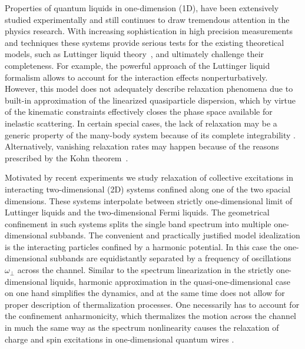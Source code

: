 
\label{chap3}
Properties of quantum liquids in one-dimension (1D), have been extensively studied experimentally and still continues to draw tremendous attention in the physics research.\cite{Review-1,Review-2,Review-3}  With increasing sophistication in high precision measurements and techniques these systems provide serious tests for the existing theoretical models, such as Luttinger liquid theory~\cite{Haldane,Stone,Gogolin,Giamarchi}, and ultimately challenge their completeness.  For example, the powerful approach of the Luttinger liquid formalism allows to account for the interaction effects nonperturbatively. However, this model does not adequately describe relaxation phenomena due to built-in approximation of the linearized quasiparticle dispersion, which by virtue of the kinematic constraints effectively closes the phase space available for inelastic scattering. In certain special cases, the lack of relaxation may be a generic property of the many-body system because of its complete integrability \cite{Mattis,Sutherland}. Alternatively, vanishing relaxation rates may happen because of the reasons prescribed by the Kohn theorem~\cite{Kohn1961,Dobson1994}.     

Motivated by recent experiments \cite{Kinast,Bartenstein,Altmeyer,Wright} we study relaxation of collective excitations in interacting two-dimensional (2D) systems confined along one of the two spacial dimensions. These systems interpolate between strictly one-dimensional limit of Luttinger liquids and the two-dimensional Fermi liquids. The geometrical confinement in such systems splits the single band spectrum into multiple one-dimensional subbands. The convenient and practically justified model idealization is the interacting particles confined by a harmonic potential. In this case the one-dimensional subbands are equidistantly separated by a frequency of oscillations $\omega_\perp$ across the channel. Similar to the spectrum linearization in the strictly one-dimensional liquids, harmonic approximation in the quasi-one-dimensional case on one hand simplifies the dynamics, and at the same time does not allow for proper description of thermalization processes. One necessarily has to account for the confinement anharmonicity, which thermalizes the motion across the channel in much the same way as the spectrum nonlinearity causes the relaxation of charge and spin excitations in one-dimensional quantum wires \cite{Khodas,Barak,Karzig,Micklitz,Levchenko}. 

